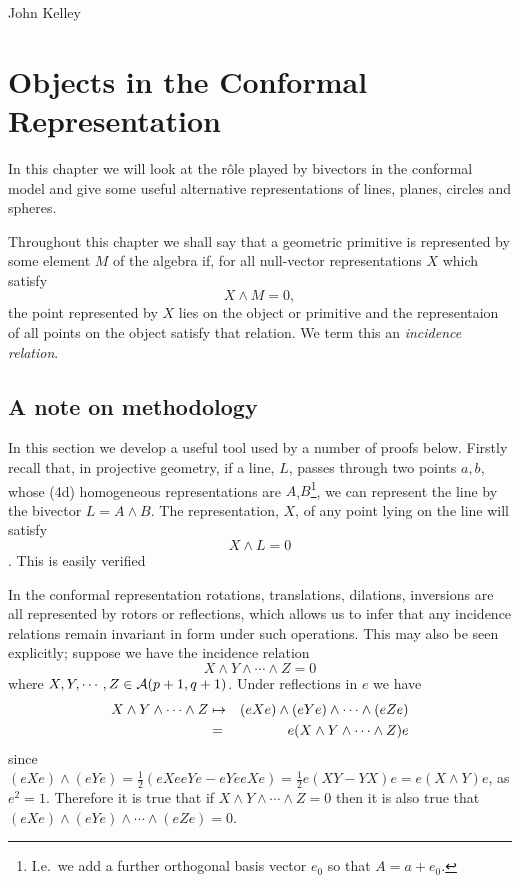 \begin{savequote}
%
{John Kelley}%
\end{savequote}
\chapter{Objects in the Conformal Representation}

In this chapter we will look
at the r\^ole played by bivectors in the conformal model and give some useful
alternative representations of lines, planes, circles and spheres.

Throughout this chapter we shall say that a geometric primitive is
represented by some element $M$ of the algebra if, for all
null-vector representations $X$ which satisfy
\[
X \wedge M = 0,
\]
the point represented by $X$ lies on the object or primitive and the representaion of all
points on the object satisfy that relation. We term this an \emph{incidence
relation}.

\section{A note on methodology}
 
In this section we develop a useful tool used by a number of proofs below.
Firstly recall that, in projective geometry, if a line, $L$, 
passes through two points $a,b$, whose (4d) homogeneous representations are 
$A$,$B$\footnote{I.e.\ we add a further orthogonal basis vector $e_0$ so that
$A = a + e_0$.}, we can represent the line by the bivector $L=A\wedge B$. The 
representation, $X$, of any point lying on the line will satisfy
%
\[ X\wedge L = 0  \].
This is easily verified

In the conformal representation rotations, translations, dilations, inversions
are all represented by rotors or reflections, which allows us to infer that any
incidence relations remain invariant in form under such operations. This may
also be seen explicitly; suppose we have the incidence relation
%
\[ X \wedge Y \wedge \cdots  \wedge Z = 0 \]
%
where $X,Y,\cdots,Z \in {\mathcal{A}}(p+1,q+1)$. Under
reflections in $e$ we have
%
\begin{eqnarray}
   X \wedge Y \wedge \cdots  \wedge Z & \mapsto & (eXe) \wedge (eYe) \wedge \cdots
\wedge (eZe) \nonumber \\
   & = & e( X \wedge Y \wedge \cdots  \wedge Z)e \nonumber
\end{eqnarray}
%
since $(eXe)\wedge (eYe) = \frac{1}{2}(eXeeYe - eYeeXe) = \frac{1}{2}e(XY-YX)e 
= e(X\wedge Y)e$, as $e^2=1$. Therefore it is true that if $X\wedge Y\wedge \cdots
\wedge Z=0$ then it is also true that $(eXe)\wedge (eYe)\wedge \cdots \wedge (eZe)=0$.

